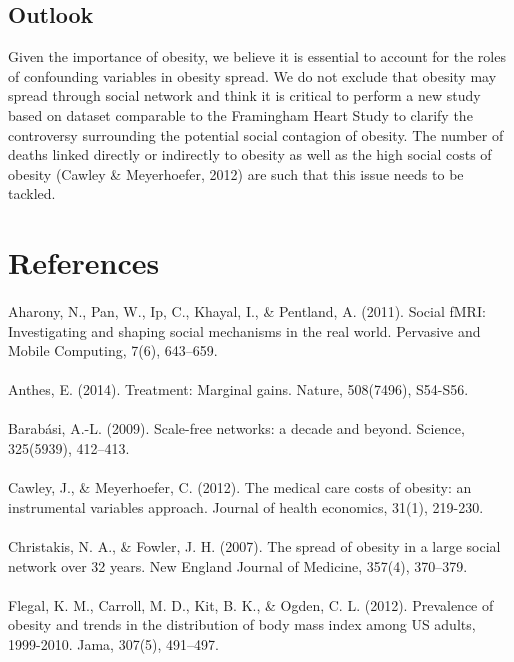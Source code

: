 \documentclass[11pt]{article}
\begin{document}
\subsection{Outlook}

Given the importance of obesity, we believe it is essential to account for the roles of confounding variables in obesity spread. We do not exclude that obesity may spread through social network and think it is critical to perform a new study based on dataset comparable to the Framingham Heart Study to clarify the controversy surrounding the potential social contagion of obesity. The number of deaths linked directly or indirectly to obesity as well as the high social costs of obesity (Cawley \& Meyerhoefer, 2012) are such that this issue needs to be tackled.

\newpage
\section{References}
\paragraph{}
Aharony, N., Pan, W., Ip, C., Khayal, I., \& Pentland, A. (2011). Social fMRI: Investigating and shaping social mechanisms in the real world. Pervasive and Mobile Computing, 7(6), 643–659.
\paragraph{}
Anthes, E. (2014). Treatment: Marginal gains. Nature, 508(7496), S54-S56.
\paragraph{}
Barabási, A.-L. (2009). Scale-free networks: a decade and beyond. Science, 325(5939), 412–413.
\paragraph{}
Cawley, J., \& Meyerhoefer, C. (2012). The medical care costs of obesity: an instrumental variables approach. Journal of health economics, 31(1), 219-230.
\paragraph{}
Christakis, N. A., \& Fowler, J. H. (2007). The spread of obesity in a large social network over 32 years. New England Journal of Medicine, 357(4), 370–379.
\paragraph{}
Flegal, K. M., Carroll, M. D., Kit, B. K., \& Ogden, C. L. (2012). Prevalence of obesity and trends in the distribution of body mass index among US adults, 1999-2010. Jama, 307(5), 491–497.
\end{document}
